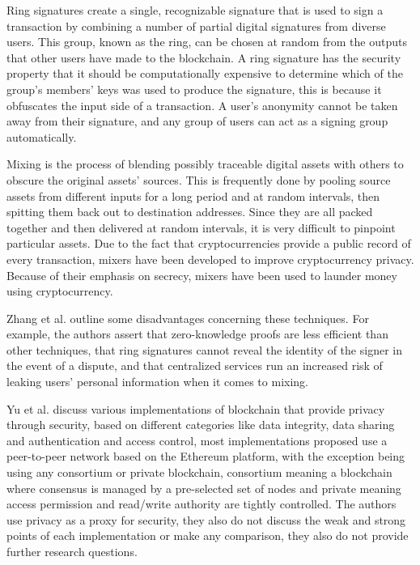 Ring signatures create a single, recognizable signature that is used to sign
a transaction by combining a number of partial digital signatures from diverse
users. This group, known as the ring, can be chosen at random from the outputs
that other users have made to the blockchain. A ring signature has the security
property that it should be computationally expensive to determine which
of the group's members' keys was used to produce the signature, this is because
it obfuscates the input side of a transaction. A user's anonymity cannot
be taken away from their signature, and any group of users can act as a signing
group automatically.

Mixing is the process of blending possibly traceable digital assets
with others to obscure the original assets' sources. This is frequently done
by pooling source assets from different inputs for a long period and at random
intervals, then spitting them back out to destination addresses. Since they
are all packed together and then delivered at random intervals, it is very
difficult to pinpoint particular assets. Due to the fact that cryptocurrencies
provide a public record of every transaction, mixers have been developed
to improve cryptocurrency privacy. Because of their emphasis on secrecy,
mixers have been used to launder money using cryptocurrency.

Zhang et al. \cite{zhang2019security} outline some disadvantages concerning
these techniques. For example, the authors assert that zero-knowledge proofs
are less efficient than other techniques, that ring signatures cannot reveal
the identity of the signer in the event of a dispute, and that centralized
services run an increased risk of leaking users' personal information when
it comes to mixing.

Yu et al. \cite{yu2018blockchain} discuss various implementations of blockchain
that provide privacy through security, based on different categories like
data integrity, data sharing and authentication and access control, most
implementations proposed use a peer-to-peer network based on the Ethereum
platform, with the exception being using any consortium or private blockchain,
consortium meaning a blockchain where consensus is managed by a pre-selected set
of nodes and private meaning access permission and read/write authority are
tightly controlled. The authors use privacy as a proxy for security, they also
do not discuss the weak and strong points of each implementation or make any
comparison, they also do not provide further research questions.

